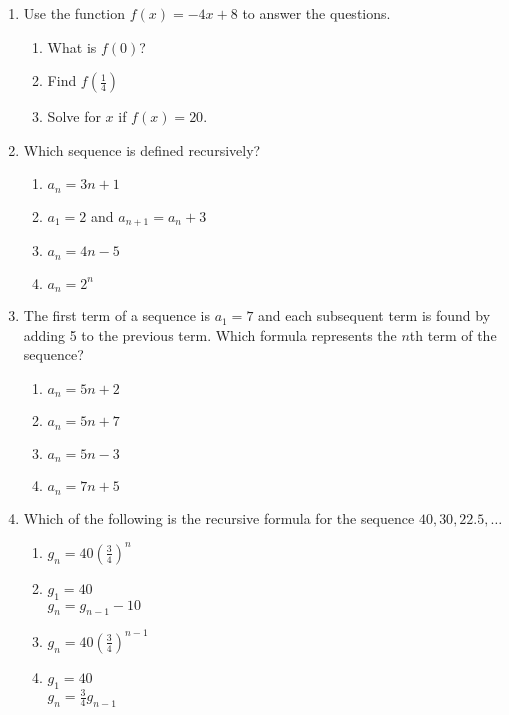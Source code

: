 \documentclass[12pt, twoside]{article}
\begin{document}
\begin{enumerate}[itemsep=0.5cm]
\item Use the function $f(x) = -4x+8$ to answer the questions.
  \begin{multicols}{2}
  \begin{enumerate}[itemsep=2cm]
      \item What is $f(0)$?
      \item Find $f(\frac{1}{4})$
      \item Solve for $x$ if $f(x) = 20$.
  \end{enumerate}
  \end{multicols} \vspace{1cm}

\newpage

\item Which sequence is defined recursively?
\begin{enumerate}
    \item $a_n = 3n + 1$
    \item $a_1 = 2$ and $a_{n+1} = a_n + 3$
    \item $a_n = 4n - 5$
    \item $a_n = 2^n$
\end{enumerate}

\item The first term of a sequence is $a_1 = 7$ and each subsequent term is found by adding 5 to the previous term. Which formula represents the $n$th term of the sequence?
\begin{enumerate}
    \item $a_n = 5n + 2$
    \item $a_n = 5n + 7$
    \item $a_n = 5n - 3$
    \item $a_n = 7n + 5$
\end{enumerate}

\item Which of the following is the recursive formula for the sequence $40, 30, 22.5, \ldots$
  \begin{multicols}{2}
  \begin{enumerate}
    \item $g_n = 40 \left( \frac{3}{4} \right)^n$
    \item $g_1 = 40$ \\ $g_n = g_{n-1} -10$
    \item $g_n = 40 \left( \frac{3}{4} \right)^{n-1}$
    \item $g_1 = 40$ \\ $g_n = \frac{3}{4} g_{n-1}$
  \end{enumerate}
  \end{multicols}


\end{enumerate}
\end{document}
